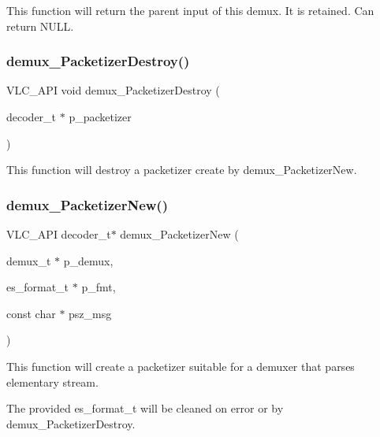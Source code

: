 This function will return the parent input of this demux. It is retained. Can return N\+U\+LL. \mbox{\label{group__demux_ga67bbb8bff77333e401f3aece9ce180e8}} 
\subsubsection{\texorpdfstring{demux\+\_\+\+Packetizer\+Destroy()}{demux\_PacketizerDestroy()}}
{\footnotesize\ttfamily V\+L\+C\+\_\+\+A\+PI void demux\+\_\+\+Packetizer\+Destroy (\begin{DoxyParamCaption}\item[{decoder\+\_\+t $\ast$}]{p\+\_\+packetizer }\end{DoxyParamCaption})}

This function will destroy a packetizer create by demux\+\_\+\+Packetizer\+New. \mbox{\label{group__demux_ga918379bccc4f76159fefd3230890e09e}} 
\subsubsection{\texorpdfstring{demux\+\_\+\+Packetizer\+New()}{demux\_PacketizerNew()}}
{\footnotesize\ttfamily V\+L\+C\+\_\+\+A\+PI decoder\+\_\+t$\ast$ demux\+\_\+\+Packetizer\+New (\begin{DoxyParamCaption}\item[{demux\+\_\+t $\ast$}]{p\+\_\+demux,  }\item[{es\+\_\+format\+\_\+t $\ast$}]{p\+\_\+fmt,  }\item[{const char $\ast$}]{psz\+\_\+msg }\end{DoxyParamCaption})}

This function will create a packetizer suitable for a demuxer that parses elementary stream.

The provided es\+\_\+format\+\_\+t will be cleaned on error or by demux\+\_\+\+Packetizer\+Destroy. 